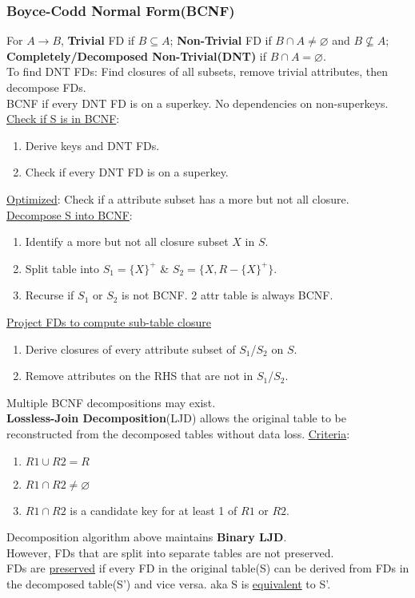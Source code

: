 \begin{multicols*}{3}
\subsubsection{Boyce-Codd Normal Form(BCNF)}
For $A\rightarrow B$, \textbf{Trivial} FD if $B\subseteq A$; \textbf{Non-Trivial} FD if $B \cap A \neq \varnothing$ and $B \nsubseteq A$; \textbf{Completely/Decomposed Non-Trivial(DNT)} if $B \cap A = \varnothing$.\\
To find DNT FDs: Find closures of all subsets, remove trivial attributes, then decompose FDs.\\
BCNF if every DNT FD is on a superkey. No dependencies on non-superkeys.\\
\underline{Check if S is in BCNF}: 
\begin{enumerate}[leftmargin=*]
    \item Derive keys and DNT FDs.
    \item Check if every DNT FD is on a superkey.
\end{enumerate}
\underline{Optimized}: Check if a attribute subset has a more but not all closure.\\
\underline{Decompose S into BCNF}: 
\begin{enumerate}[leftmargin=*]
    \item Identify a more but not all closure subset $X$ in $S$.
    \item   Split table into $S_1=\{X\}^+$ \& $S_2=\{X, $$R-\{X\}^+\}$.
    \item  Recurse if $S_1$ or $S_2$ is not BCNF. 2 attr table is always BCNF.
\end{enumerate}
\underline{Project FDs to compute sub-table closure}
\begin{enumerate}[leftmargin=*]
    \item Derive closures of every attribute subset of $S_1$/$S_2$ on $S$.
    \item Remove attributes on the RHS that are not in $S_1$/$S_2$.
\end{enumerate}
Multiple BCNF decompositions may exist.\\
\textbf{Lossless-Join Decomposition}(LJD) allows the original table to be reconstructed from the decomposed tables without data loss. \underline{Criteria}:
\begin{enumerate}[leftmargin=*]
    \item $R1\cup R2=R$
    \item $R1\cap R2\neq \varnothing$
    \item $R1\cap R2$ is a candidate key for at least 1 of $R1$ or $R2$. 
\end{enumerate}
Decomposition algorithm above maintains \textbf{Binary LJD}.\\
However, FDs that are split into separate tables are not preserved.\\
FDs are \underline{preserved} if every FD in the original table(S) can be derived from FDs in the decomposed table(S') and vice versa. aka S is \underline{equivalent} to S'.\\


\end{multicols*}
